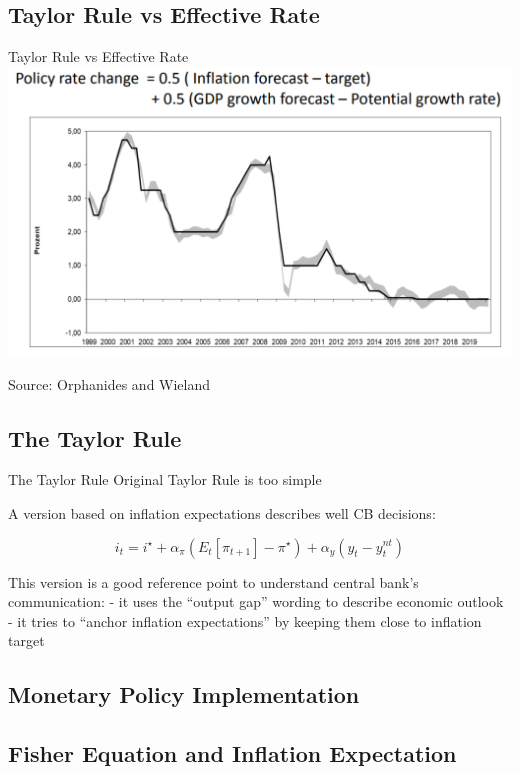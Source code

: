 \documentclass[
  ignorenonframetext,
  aspectratio=169,
]{beamer}
\begin{document}
\subsection{Taylor Rule vs Effective
Rate}\label{taylor-rule-vs-effective-rate-1}

\begin{frame}{Taylor Rule vs Effective Rate}
\includegraphics{taylor_rule_vs_effective_2.png}

Source: Orphanides and Wieland
\end{frame}

\subsection{The Taylor Rule}\label{the-taylor-rule}

\begin{frame}{The Taylor Rule}
Original Taylor Rule is too simple

A version based on inflation expectations describes well CB decisions:

\[i_t = i^{\star} + \alpha_{\pi} (E_t \left[ \pi_{t+1} \right] - \pi^{\star}) + \alpha_y (y_t - y_t^ {nt})\]

This version is a good reference point to understand central bank's
communication: - it uses the ``output gap'' wording to describe economic
outlook - it tries to ``anchor inflation expectations'' by keeping them
close to inflation target
\end{frame}

\subsection{Monetary Policy
Implementation}\label{monetary-policy-implementation}

\subsection{Fisher Equation and Inflation
Expectation}\label{fisher-equation-and-inflation-expectation}
\end{document}
